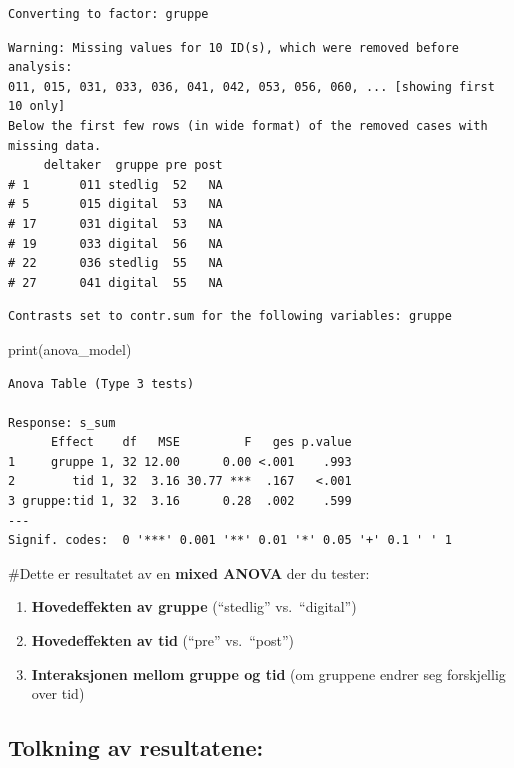 \documentclass[
  letterpaper,
  DIV=11,
  numbers=noendperiod]{scrreprt}
\newenvironment{Shaded}{\begin{snugshade}}{\end{snugshade}}
\newcommand{\FunctionTok}[1]{\textcolor[rgb]{0.28,0.35,0.67}{#1}}
\newcommand{\NormalTok}[1]{\textcolor[rgb]{0.00,0.23,0.31}{#1}}
\providecommand{\tightlist}{%
  \setlength{\itemsep}{0pt}\setlength{\parskip}{0pt}}\usepackage{longtable,booktabs,array}
\begin{document}
\begin{verbatim}
Converting to factor: gruppe
\end{verbatim}

\begin{verbatim}
Warning: Missing values for 10 ID(s), which were removed before analysis:
011, 015, 031, 033, 036, 041, 042, 053, 056, 060, ... [showing first 10 only]
Below the first few rows (in wide format) of the removed cases with missing data.
     deltaker  gruppe pre post
# 1       011 stedlig  52   NA
# 5       015 digital  53   NA
# 17      031 digital  53   NA
# 19      033 digital  56   NA
# 22      036 stedlig  55   NA
# 27      041 digital  55   NA
\end{verbatim}

\begin{verbatim}
Contrasts set to contr.sum for the following variables: gruppe
\end{verbatim}

\begin{Shaded}
\begin{Highlighting}[]
\FunctionTok{print}\NormalTok{(anova\_model)}
\end{Highlighting}
\end{Shaded}

\begin{verbatim}
Anova Table (Type 3 tests)

Response: s_sum
      Effect    df   MSE         F   ges p.value
1     gruppe 1, 32 12.00      0.00 <.001    .993
2        tid 1, 32  3.16 30.77 ***  .167   <.001
3 gruppe:tid 1, 32  3.16      0.28  .002    .599
---
Signif. codes:  0 '***' 0.001 '**' 0.01 '*' 0.05 '+' 0.1 ' ' 1
\end{verbatim}

\#Dette er resultatet av en \textbf{mixed ANOVA} der du tester:

\begin{enumerate}
\def\labelenumi{\arabic{enumi}.}
\tightlist
\item
  \textbf{Hovedeffekten av gruppe} (``stedlig'' vs.~``digital'')\\
\item
  \textbf{Hovedeffekten av tid} (``pre'' vs.~``post'')\\
\item
  \textbf{Interaksjonen mellom gruppe og tid} (om gruppene endrer seg
  forskjellig over tid)
\end{enumerate}

\hypertarget{tolkning-av-resultatene}{%
\subsection{\texorpdfstring{\textbf{Tolkning av
resultatene:}}{Tolkning av resultatene:}}\label{tolkning-av-resultatene}}
\end{document}
